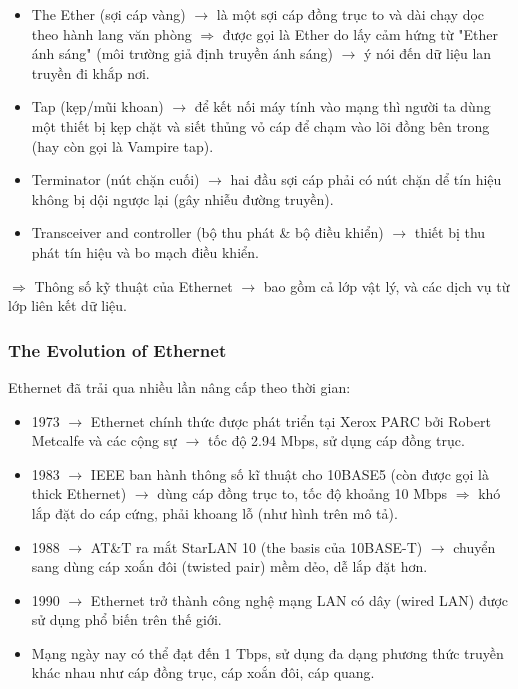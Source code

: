 \begin{itemize}
    \item The Ether (sợi cáp vàng) $\rightarrow$ là một sợi cáp đồng trục to và dài chạy dọc theo hành lang văn phòng $\Rightarrow$ được gọi là Ether do lấy cảm hứng từ "Ether ánh sáng" (môi trường giả định truyền ánh sáng) $\rightarrow$ ý nói đến dữ liệu lan truyền đi khắp nơi.
    \item Tap (kẹp/mũi khoan) $\rightarrow$ để kết nối máy tính vào mạng thì người ta dùng một thiết bị kẹp chặt và siết thủng vỏ cáp để chạm vào lõi đồng bên trong (hay còn gọi là Vampire tap).
    \item Terminator (nút chặn cuối) $\rightarrow$ hai đầu sợi cáp phải có nút chặn dể tín hiệu không bị dội ngược lại (gây nhiễu đường truyền).
    \item Transceiver and controller (bộ thu phát \& bộ điều khiển) $\rightarrow$ thiết bị thu phát tín hiệu và bo mạch điều khiển.
\end{itemize}

\noindent
$\Rightarrow$ Thông số kỹ thuật của Ethernet $\rightarrow$ bao gồm cả lớp vật lý, và các dịch vụ từ lớp liên kết dữ liệu.
\medskip

\subsubsection{The Evolution of Ethernet}

\noindent
Ethernet đã trải qua nhiều lần nâng cấp theo thời gian:

\begin{itemize}
    \item 1973 $\rightarrow$ Ethernet chính thức được phát triển tại Xerox PARC bởi Robert Metcalfe và các cộng sự $\rightarrow$ tốc độ 2.94 Mbps, sử dụng cáp đồng trục.
    \item 1983 $\rightarrow$ IEEE ban hành thông số kĩ thuật cho 10BASE5 (còn được gọi là thick Ethernet) $\rightarrow$ dùng cáp đồng trục to, tốc độ khoảng 10 Mbps $\Rightarrow$ khó lắp đặt do cáp cứng, phải khoang lỗ (như hình trên mô tả).
    \item 1988 $\rightarrow$ AT\&T ra mắt StarLAN 10 (the basis của 10BASE-T) $\rightarrow$ chuyển sang dùng cáp xoắn đôi (twisted pair) mềm dẻo, dễ lắp đặt hơn.
    \item 1990 $\rightarrow$ Ethernet trở thành công nghệ mạng LAN có dây (wired LAN) được sử dụng phổ biến trên thế giới.
    \item Mạng ngày nay có thể đạt đến 1 Tbps, sử dụng đa dạng phương thức truyền khác nhau như cáp đồng trục, cáp xoắn đôi, cáp quang.
\end{itemize}
\medskip

